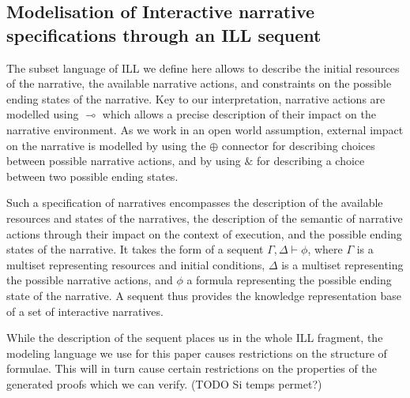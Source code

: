 \documentclass[runningheads,a4paper]{llncs}
\begin{document}
\subsection{Modelisation of Interactive narrative specifications through an ILL sequent}

The subset language of ILL we define here allows to describe the initial resources of the narrative, the available narrative actions, and constraints on the possible ending states of the narrative. Key to our interpretation, narrative actions are modelled using $\multimap$ which allows a precise description of their impact on the narrative environment. As we work in an open world assumption, external impact on the narrative is modelled by using the $\oplus$ connector for describing choices between possible narrative actions, and by using $\&$ for describing a choice between two possible ending states.

Such a specification of narratives encompasses the description of the available resources and states of the narratives, the description of the semantic of narrative actions through their impact on the context of execution, and the possible ending states of the narrative. It takes the form of a sequent $\Gamma , \Delta \vdash \phi$, where $\Gamma$ is a multiset representing resources and initial conditions, $\Delta$ is a multiset representing the possible narrative actions, and $\phi$ a formula representing the possible ending state of the narrative. A sequent thus provides the knowledge representation base of a set of interactive narratives. 

While the description of the sequent places us in the whole ILL fragment, the modeling language we use for this paper causes restrictions on the structure of formulae. This will in turn cause certain restrictions on the properties of the generated proofs which we can verify. (TODO Si temps permet?)
%
\end{document}
